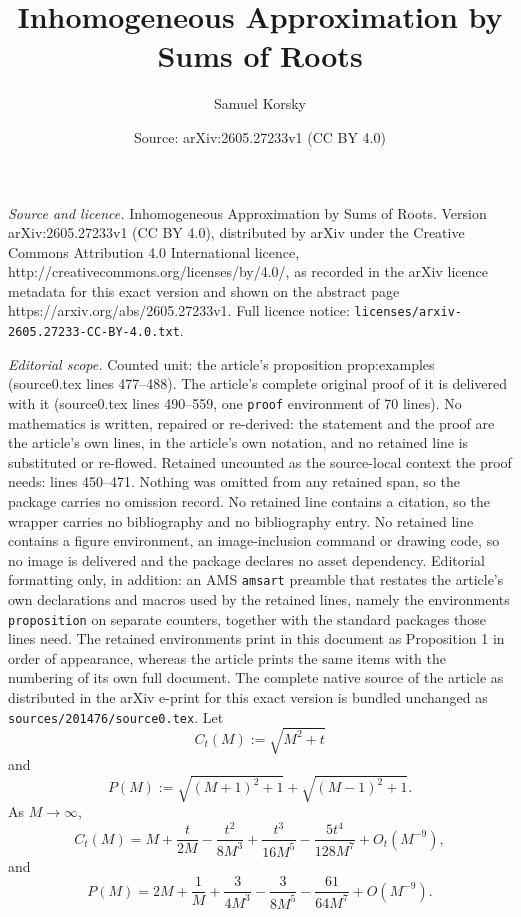 \documentclass[10pt,a4paper]{amsart}
\title{Inhomogeneous Approximation by Sums of Roots}
\author{Samuel Korsky}
\date{Source: arXiv:2605.27233v1 (CC BY 4.0)}
\begin{document}
\maketitle

\noindent\emph{Source and licence.} Inhomogeneous Approximation by Sums of Roots. Version arXiv:2605.27233v1 (CC BY 4.0), distributed by arXiv under the Creative Commons Attribution 4.0 International licence, http://creativecommons.org/licenses/by/4.0/, as recorded in the arXiv licence metadata for this exact version and shown on the abstract page https://arxiv.org/abs/2605.27233v1. Full licence notice: \texttt{licenses/arxiv-2605.27233-CC-BY-4.0.txt}.\par\smallskip

\noindent\textit{Editorial scope.} Counted unit: the article's proposition prop:examples (source0.tex lines 477--488). The article's complete original proof of it is delivered with it (source0.tex lines 490--559, one \texttt{proof} environment of 70 lines). No mathematics is written, repaired or re-derived: the statement and the proof are the article's own lines, in the article's own notation, and no retained line is substituted or re-flowed.  Retained uncounted as the source-local context the proof needs: lines 450--471.  Nothing was omitted from any retained span, so the package carries no omission record.  No retained line contains a citation, so the wrapper carries no bibliography and no bibliography entry.  No retained line contains a figure environment, an image-inclusion command or drawing code, so no image is delivered and the package declares no asset dependency.  Editorial formatting only, in addition: an AMS \texttt{amsart} preamble that restates the article's own declarations and macros used by the retained lines, namely the environments \texttt{proposition} on separate counters, together with the standard packages those lines need.  The retained environments print in this document as Proposition 1 in order of appearance, whereas the article prints the same items with the numbering of its own full document.  The complete native source of the article as distributed in the arXiv e-print for this exact version is bundled unchanged as \texttt{sources/201476/source0.tex}.
\bigskip
\noindent
Let
\[
  C_t(M):=\sqrt{M^2+t}
\]
and
\[
  P(M):=\sqrt{(M+1)^2+1}+\sqrt{(M-1)^2+1}.
\]
As $M\to\infty$,
\[
  C_t(M)=M+\frac{t}{2M}-\frac{t^2}{8M^3}
  +\frac{t^3}{16M^5}-\frac{5t^4}{128M^7}+O_t(M^{-9}),
  \tag{5.1}\label{eq:C-expansion}
\]
and
\[
  P(M)=2M+\frac1M+\frac{3}{4M^3}-\frac{3}{8M^5}
  -\frac{61}{64M^7}+O(M^{-9}).
  \tag{5.2}\label{eq:P-expansion}
\]
\end{document}
